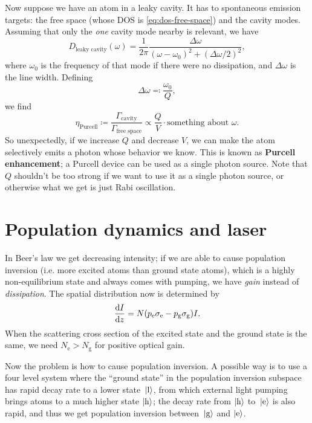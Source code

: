\documentclass[hyperref, a4paper]{article}
\newcommand*{\concept}[1]{{\textbf{#1}}}
\newcommand*{\pope}{p_{\text{e}}}
\newcommand*{\popg}{p_{\text{g}}}
\begin{document}
Now suppose we have an atom in a leaky cavity.
It has to spontaneous emission targets:
the free space (whose DOS is \eqref{eq:dos-free-space})
and the cavity modes.
Assuming that only the \emph{one} cavity mode nearby is relevant,
we have 
\begin{equation}
    D_{\text{leaky cavity}}(\omega) = \frac{1}{2\pi} \frac{
        \Delta \omega
    }{
        (\omega - \omega_0)^2 + (\Delta \omega / 2)^2
    },
\end{equation}
where $\omega_0$ is the frequency of that mode 
if there were no dissipation, 
and $\Delta \omega$ is the line width.
Defining 
\begin{equation}
    \Delta \omega \eqqcolon \frac{\omega_0}{Q},
\end{equation}
we find 
\begin{equation}
    \eta_{\text{Purcell}} \coloneqq \frac{\Gamma_{\text{cavity}}}{\Gamma_{\text{free space}}}
    \propto \frac{Q}{V} \cdot \text{something about $\omega$}.
\end{equation}
So unexpectedly, if we increase $Q$ and decrease $V$, 
we can make the atom selectively emits a photon 
whose behavior we know.
This is known as \concept{Purcell enhancement};
a Purcell device can be used as a single photon source.
Note that $Q$ shouldn't be too strong if we want to use it as a single photon source, 
or otherwise what we get is just Rabi oscillation.

\section{Population dynamics and laser}

In Beer's law we get decreasing intensity; 
if we are able to cause population inversion 
(i.e. more excited atoms than ground state atoms),
which is a highly non-equilibrium state
and always comes with pumping, 
we have \emph{gain} instead of \emph{dissipation}.
The spatial distribution now is determined by 
\begin{equation}
    \dv{I}{z} = N (\pope \sigma_{\text{e}} - \popg \sigma_{\text{g}}) I.
\end{equation}
When the scattering cross section of the excited state and the ground state is the same, 
we need $N_{\text{e}} > N_{\text{g}}$ for positive optical gain. 

Now the problem is how to cause population inversion.
A possible way is to use a four level system 
where the ``ground state'' in the population inversion subspace 
has rapid decay rate to a lower state $\ket*{\text{l}}$,
from which external light pumping brings atoms to a much higher state $\ket{\text{h}}$;
the decay rate from $\ket{\text{h}}$ to $\ket*{\text{e}}$ is also rapid,
and thus we get population inversion
between $\ket*{\text{g}}$ and $\ket{\text{e}}$.
\end{document}
